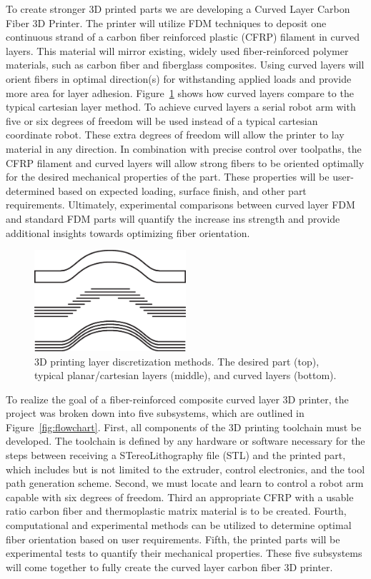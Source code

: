 \indent

To create stronger 3D printed parts we are developing a Curved Layer Carbon Fiber 3D Printer. The printer will utilize FDM techniques to deposit one continuous strand of a carbon fiber reinforced plastic (CFRP) filament in curved layers. This material will mirror existing, widely used fiber-reinforced polymer materials, such as carbon fiber and fiberglass composites. Using curved layers will orient fibers in optimal direction(s) for withstanding applied loads and provide more area for layer adhesion. Figure~\ref{fig:layers} shows how curved layers compare to the typical cartesian layer method. To achieve curved layers a serial robot arm with five or six degrees of freedom will be used instead of a typical cartesian coordinate robot. These extra degrees of freedom will allow the printer to lay material in any direction. In combination with precise control over toolpaths, the CFRP filament and curved layers will allow strong fibers to be oriented optimally for the desired mechanical properties of the part. These properties will be user-determined based on expected loading, surface finish, and other part requirements. Ultimately, experimental comparisons between curved layer FDM and standard FDM parts will quantify the increase ins strength and provide additional insights towards optimizing fiber orientation.\\

\begin{figure}[htp]
\centering
\includegraphics[width=0.5\textwidth]{./figures/layer-methods}
\caption{3D printing layer discretization methods. The desired part (top), typical planar/cartesian layers (middle), and curved layers (bottom).}
\label{fig:layers}
\end{figure}

To realize the goal of a fiber-reinforced composite curved layer 3D printer, the project was broken down into five subsystems, which are outlined in Figure~\ref{fig:flowchart}. First, all components of the 3D printing toolchain must be developed. The toolchain is defined by any hardware or software necessary for the steps between receiving a STereoLithography file (STL) and the printed part, which includes but is not limited to the extruder, control electronics, and the tool path generation scheme. Second, we must locate and learn to control a robot arm capable with six degrees of freedom. Third an appropriate CFRP with a usable ratio carbon fiber and thermoplastic matrix material is to be created. Fourth, computational and experimental methods can be utilized to determine optimal fiber orientation based on user requirements. Fifth, the printed parts will be experimental tests to quantify their mechanical properties. These five subsystems will come together to fully create the curved layer carbon fiber 3D printer.

